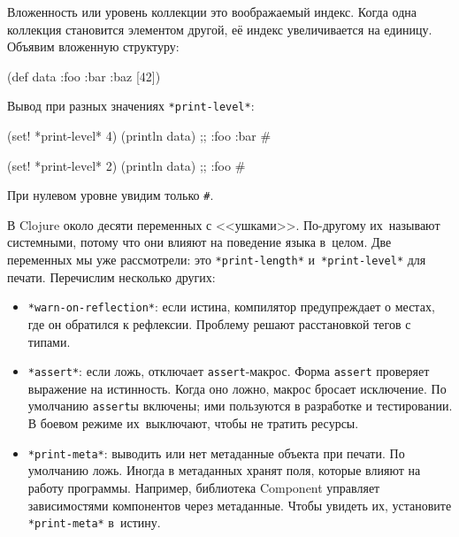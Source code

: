 Вложенность или уровень коллекции это воображаемый индекс. Когда одна коллекция
становится элементом другой, её индекс увеличивается на единицу. Объявим
вложенную структуру:

\begin{english}
  \begin{clojure}
(def data {:foo {:bar {:baz [42]}}})
  \end{clojure}
\end{english}

\noindent
Вывод при разных значениях \verb|*print-level*|:

\begin{english}
  \begin{clojure}
(set! *print-level* 4)
(println data)
;; {:foo {:bar #}}

(set! *print-level* 2)
(println data)
;; {:foo #}
  \end{clojure}
\end{english}

\noindent
При нулевом уровне увидим только \verb|#|.


В Clojure около десяти переменных с <<ушками>>. По-другому их~называют
системными, потому что они влияют на поведение языка в~целом. Две переменных мы
уже рассмотрели: это \verb|*print-length*| и~\verb|*print-level*| для
печати. Перечислим несколько других:

\begin{itemize}


\item
  \verb|*warn-on-reflection*|: если истина, компилятор предупреждает о местах,
  где он обратился к рефлексии. Проблему решают расстановкой тегов с типами.


\item
  \verb|*assert*|: если ложь, отключает \verb|assert|-макрос. Форма
  \verb|assert| проверяет выражение на истинность. Когда оно ложно, макрос
  бросает исключение.  По умолчанию \verb|assert|ы включены; ими пользуются в
  разработке и тестировании. В боевом режиме их~выключают, чтобы не тратить
  ресурсы.


\item
  \verb|*print-meta*|: выводить или нет метаданные объекта при печати. По
  умолчанию ложь. Иногда в метаданных хранят поля, которые влияют на работу
  программы. Например, библиотека Component управляет зависимостями компонентов
  через метаданные. Чтобы увидеть их, установите \verb|*print-meta*| в~истину.

\end{itemize}

